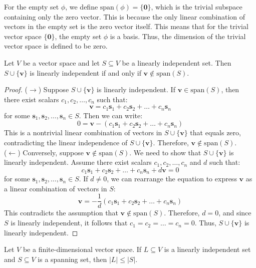 \documentclass[openany]{book}
\begin{document}
\begin{mynote}
    For the empty set $\phi$, we define $\text{span}(\phi) = \{\mathbf{0}\}$, which is the trivial subspace containing only the zero vector. This is because the only linear combination of vectors in the empty set is the zero vector itself.
    This means that for the trivial vector space $\{\mathbf{0}\}$, the empty set $\phi$ is a basis. Thus, the dimension of the trivial vector space is defined to be zero.
\end{mynote}
\begin{mytheorem}
    Let $V$ be a vector space and let $S \subseteq V$ be a linearly independent set. Then $S \cup \{\mathbf{v}\}$ is linearly independent if and only if $\mathbf{v} \notin \text{span}(S)$.
\end{mytheorem}
\begin{proof}
    ($\rightarrow$) Suppose $S \cup \{\mathbf{v}\}$ is linearly independent. If $\mathbf{v} \in \text{span}(S)$, then there exist scalars $c_1, c_2, \ldots, c_n$ such that:
    $$\mathbf{v} = c_1 \mathbf{s}_1 + c_2 \mathbf{s}_2 + \ldots + c_n \mathbf{s}_n$$
    for some $\mathbf{s}_1, \mathbf{s}_2, \ldots, \mathbf{s}_n \in S$. Then we can write:
    $$0 = \mathbf{v} - (c_1 \mathbf{s}_1 + c_2 \mathbf{s}_2 + \ldots + c_n \mathbf{s}_n)$$
    This is a nontrivial linear combination of vectors in $S \cup \{\mathbf{v}\}$ that equals zero, contradicting the linear independence of $S \cup \{\mathbf{v}\}$. Therefore, $\mathbf{v} \notin \text{span}(S)$. \\
    ($\leftarrow$) Conversely, suppose $\mathbf{v} \notin \text{span}(S)$. We need to show that $S \cup \{\mathbf{v}\}$ is linearly independent. Assume there exist scalars $c_1, c_2, \ldots, c_n$ and $d$ such that:
    $$c_1 \mathbf{s}_1 + c_2 \mathbf{s}_2 + \ldots + c_n \mathbf{s}_n + d\mathbf{v} = 0$$
    for some $\mathbf{s}_1, \mathbf{s}_2, \ldots, \mathbf{s}_n \in S$. If $d \neq 0$, we can rearrange the equation to express $\mathbf{v}$ as a linear combination of vectors in $S$:
    $$\mathbf{v} = -\frac{1}{d}(c_1 \mathbf{s}_1 + c_2 \mathbf{s}_2 + \ldots + c_n \mathbf{s}_n)$$
    This contradicts the assumption that $\mathbf{v} \notin \text{span}(S)$. Therefore, $d = 0$, and since $S$ is linearly independent, it follows that $c_1 = c_2 = \ldots = c_n = 0$. Thus, $S \cup \{\mathbf{v}\}$ is linearly independent.
\end{proof}
\begin{mytheorem}
    Let $V$ be a finite-dimensional vector space. If $L \subseteq V$ is a linearly independent set and $S \subseteq V$ is a spanning set, then $\lvert L \rvert \leq \lvert S \rvert$.
\end{mytheorem}
\end{document}
